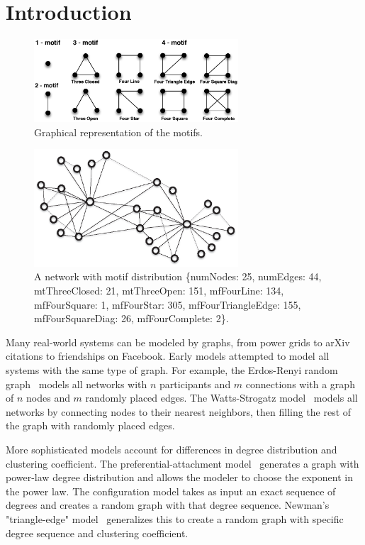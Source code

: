 \section{Introduction}
\label{sec:intro}
\begin{figure}[t]
\centering
\includegraphics[width=3in]{Figures/motifs1.eps}
\caption{Graphical representation of the motifs.}
\label{fig:motif}
\end{figure}

\begin{figure}[t]
\centering
\includegraphics[width=3in]{Figures/network.eps}
\caption{A network with motif distribution \{numNodes: 25, numEdges: 44,
mtThreeClosed: 21, mtThreeOpen: 151, mfFourLine: 134,
mfFourSquare: 1, mfFourStar: 305, mfFourTriangleEdge: 155,
mfFourSquareDiag: 26, mfFourComplete: 2\}.}
\label{fig:network}
\end{figure}

Many real-world systems can be modeled by graphs, from power grids to arXiv citations to friendships on Facebook.  Early models attempted to model all systems with the same type of graph.  For example, the Erdos-Renyi random graph~\cite{erdds1959random}\cite{erdos1960random} models all networks with $n$ participants and $m$ connections with a graph of $n$ nodes and $m$ randomly placed edges.  The Watts-Strogatz model~\cite{watts1998collective} models all networks by connecting nodes to their nearest neighbors, then filling the rest of the graph with randomly placed edges.

More sophisticated models account for differences in degree distribution and clustering coefficient.  The preferential-attachment model~\cite{albert2002statistical} generates a graph with power-law degree distribution and allows the modeler to choose the exponent in the power law.  The configuration model takes as input an exact sequence of degrees and creates a random graph with that degree sequence.  Newman's "triangle-edge" model~\cite{newman2009random} generalizes this to create a random graph with specific degree sequence and clustering coefficient.

